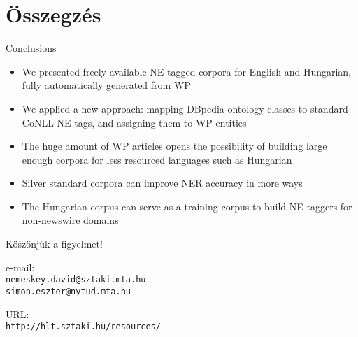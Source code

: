 \documentclass[utf8x,t]{beamer}
\newcommand{\vitem}{\item \vspace{4pt}}
\begin{document}



\section{Összegzés}
\begin{frame}{Conclusions}
  \begin{itemize}
  \vitem We presented freely available NE tagged corpora for English and Hungarian, fully automatically generated from WP
  \vitem We applied a new approach: mapping DBpedia ontology classes to standard CoNLL NE tags, and assigning them to WP entities
  \vitem The huge amount of WP articles opens the possibility of building large enough corpora for less resourced languages such as Hungarian
  \vitem Silver standard corpora can improve NER accuracy in more ways
  \vitem The Hungarian corpus can serve as a training corpus to build NE taggers for non-newswire domains
  \end{itemize}
  \vfill
\end{frame}

\begin{frame}

\bigskip

\bigskip

{\huge Köszönjük a figyelmet!}

\bigskip
\bigskip
\bigskip

e-mail: \\ {\tt nemeskey.david@sztaki.mta.hu \\ simon.eszter@nytud.mta.hu} \\

\bigskip
\bigskip

URL: \\ {\tt http://hlt.sztaki.hu/resources/}


\end{frame}
\end{document}
